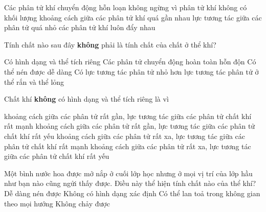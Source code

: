 \begin{ex}%
Các phân tử khí chuyển động hỗn loạn không ngừng vì
\choice
{phân tử khí không có khối lượng}
{khoảng cách giữa các phân tử khí quá gần nhau}
{\True lực tương tác giữa các phân tử quá nhỏ}
{các phân tử khí luôn đẩy nhau}
\end{ex}

\begin{ex}%
Tính chất nào sau đây \textbf{không} phải là tính chất của chất ở thể khí?

\choice
{\True Có hình dạng và thể tích riêng}
{Các phân tử chuyển động hoàn toàn hỗn độn}
{Có thể nén được dễ dàng}
{Có lực tương tác phân tử nhỏ hơn lực tương tác phân tử ở thể rắn và thể lỏng}
\end{ex}

\begin{ex}%
Chất khí \textbf{không} có hình dạng và thể tích riêng là vì

\choice
{khoảng cách giữa các phân tử rất gần, lực tương tác giữa các phân tử chất khí rất mạnh}
{khoảng cách giữa các phân tử rất gần, lực tương tác giữa các phân tử chất khí rất yếu}
{khoảng cách giữa các phân tử rất xa, lực tương tác giữa các phân tử chất khí rất mạnh}
{\True khoảng cách giữa các phân tử rất xa, lực tương tác giữa các phân tử chất khí rất yếu}
\end{ex}





\begin{ex}%
Một bình nước hoa được mở nắp ở cuối lớp học nhưng ở mọi vị trí của lớp hầu như bạn nào cũng ngửi thấy được. Điều này thể hiện tính chất nào của thể khí?
\choice
{Dễ dàng nén được}
{Không có hình dạng xác định}
{\True Có thể lan toả trong không gian theo mọi hướng}
{Không chảy được}
\end{ex}


